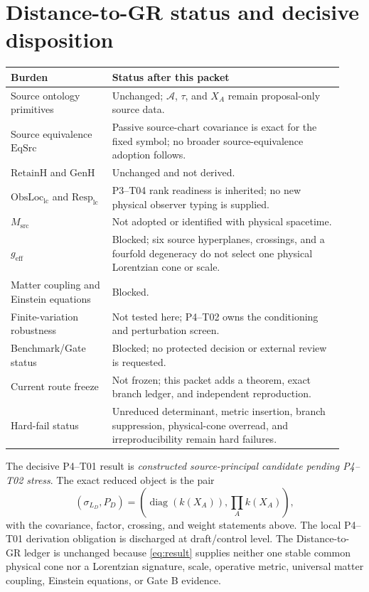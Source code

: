 \documentclass[11pt]{article}
\newcommand{\A}{\mathcal A}
\newcommand{\sigmaL}{\sigma_{L_D}}
\begin{document}
\section{Distance-to-GR status and decisive disposition}

\begin{center}
\small
\begin{tabular}{p{0.29\linewidth}p{0.64\linewidth}}
\toprule
Burden & Status after this packet\\
\midrule
Source ontology primitives & Unchanged; $\A$, $\tau$, and $X_A$ remain proposal-only source data.\\
Source equivalence $\mathrm{EqSrc}$ & Passive source-chart covariance is exact for the fixed symbol; no broader source-equivalence adoption follows.\\
$\mathrm{RetainH}$ and $\mathrm{GenH}$ & Unchanged and not derived.\\
$\mathrm{ObsLoc}_{\mathrm{lc}}$ and $\mathrm{Resp}_{\mathrm{lc}}$ & P3--T04 rank readiness is inherited; no new physical observer typing is supplied.\\
$M_{\mathrm{src}}$ & Not adopted or identified with physical spacetime.\\
$g_{\mathrm{eff}}$ & Blocked; six source hyperplanes, crossings, and a fourfold degeneracy do not select one physical Lorentzian cone or scale.\\
Matter coupling and Einstein equations & Blocked.\\
Finite-variation robustness & Not tested here; P4--T02 owns the conditioning and perturbation screen.\\
Benchmark/Gate status & Blocked; no protected decision or external review is requested.\\
Current route freeze & Not frozen; this packet adds a theorem, exact branch ledger, and independent reproduction.\\
Hard-fail status & Unreduced determinant, metric insertion, branch suppression, physical-cone overread, and irreproducibility remain hard failures.\\
\bottomrule
\end{tabular}
\end{center}

The decisive P4--T01 result is
\emph{constructed source-principal candidate pending P4--T02 stress}.
The exact reduced object is the pair
\begin{equation}
 \left(\sigmaL, P_D\right)
 =\left(\operatorname{diag}(k(X_A)),\prod_A k(X_A)\right),
 \label{eq:result}
\end{equation}
with the covariance, factor, crossing, and weight statements above.  The local
P4--T01 derivation obligation is discharged at draft/control level.  The
Distance-to-GR ledger is unchanged because \eqref{eq:result} supplies neither
one stable common physical cone nor a Lorentzian signature, scale, operative
metric, universal matter coupling, Einstein equations, or Gate B evidence.
\end{document}
